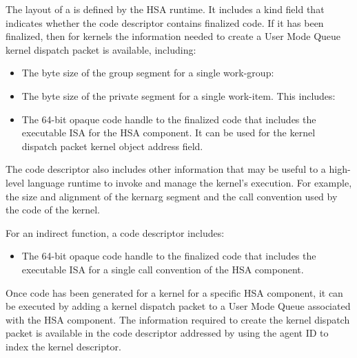 \documentclass[final,oneside]{book}
\begin{document}
The layout of a  is defined by the HSA runtime.
It includes a kind field  that indicates whether
the code descriptor contains finalized code. If it has been finalized, then for
kernels the information needed to create a User Mode Queue kernel dispatch
packet is available, including:
\begin{itemize}
\item{The byte size of the group segment for a single work-group:}
    
\item{The byte size of the private segment for a single work-item. This
    includes:}        
\item{The 64-bit opaque code handle to the finalized code that includes the
    executable ISA for the HSA component. It can be used for the kernel dispatch
    packet kernel object address field.}
\end{itemize}

The code descriptor also includes other information that may be useful to a
high-level language runtime to invoke and manage the kernel's execution. For
example, the size and alignment of the kernarg segment and the call convention
used by the code of the kernel.

For an indirect function, a code descriptor includes:
\begin{itemize}
\item{The 64-bit opaque code handle to the finalized code that includes the
    executable ISA for a single call convention of the HSA component.}
\end{itemize}

Once code has been generated for a kernel for a specific HSA component, it can
be executed by adding a kernel dispatch packet to a User Mode Queue associated
with the HSA component. The information required to create the kernel dispatch
packet is available in the code descriptor addressed by using the agent ID to
index the kernel descriptor.
\end{document}
